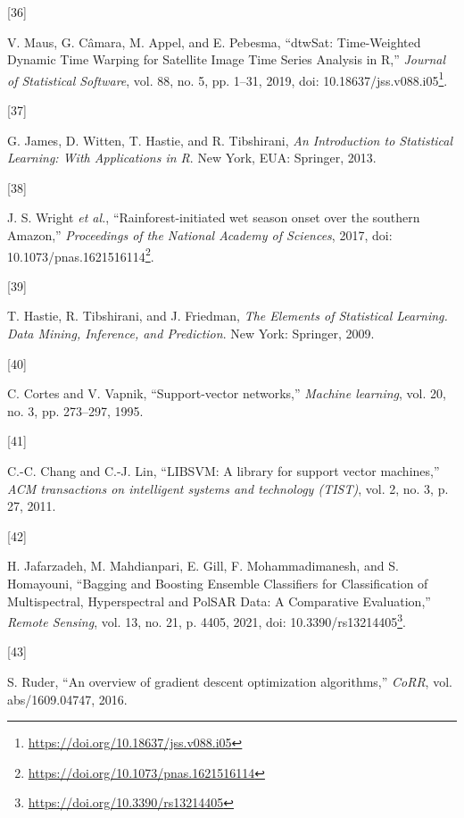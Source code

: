 \documentclass[
  11pt,
]{report}
\newlength{\cslhangindent}
\newlength{\csllabelwidth}
\newlength{\cslentryspacingunit} %
\newenvironment{CSLReferences}[2] %
 {%
  \setlength{\parindent}{0pt}
  \ifodd #1
  \let\oldpar\par
  \def\par{\hangindent=\cslhangindent\oldpar}
  \fi
  \setlength{\parskip}{#2\cslentryspacingunit}
 }%
 {}
\newcommand{\CSLLeftMargin}[1]{\parbox[t]{\csllabelwidth}{#1}}
\newcommand{\CSLRightInline}[1]{\parbox[t]{\linewidth - \csllabelwidth}{#1}\break}
\renewcommand{\href}[2]{#2\footnote{\url{#1}}}
\begin{document}
\begin{CSLReferences}{0}{0}
\leavevmode{}%
\CSLLeftMargin{{[}36{]} }%
\CSLRightInline{V. Maus, G. Câmara, M. Appel, and E. Pebesma,
{``{dtwSat}: {Time-Weighted Dynamic Time Warping} for {Satellite Image
Time Series Analysis} in {R},''} \emph{Journal of Statistical Software},
vol. 88, no. 5, pp. 1--31, 2019, doi:
\href{https://doi.org/10.18637/jss.v088.i05}{10.18637/jss.v088.i05}.}

\leavevmode{}%
\CSLLeftMargin{{[}37{]} }%
\CSLRightInline{G. James, D. Witten, T. Hastie, and R. Tibshirani,
\emph{An {Introduction} to {Statistical Learning}: With {Applications}
in {R}}. {New York, EUA}: {Springer}, 2013.}

\leavevmode{}%
\CSLLeftMargin{{[}38{]} }%
\CSLRightInline{J. S. Wright \emph{et al.}, {``Rainforest-initiated wet
season onset over the southern {Amazon},''} \emph{Proceedings of the
National Academy of Sciences}, 2017, doi:
\href{https://doi.org/10.1073/pnas.1621516114}{10.1073/pnas.1621516114}.}

\leavevmode{}%
\CSLLeftMargin{{[}39{]} }%
\CSLRightInline{T. Hastie, R. Tibshirani, and J. Friedman, \emph{The
{Elements} of {Statistical Learning}. {Data Mining}, {Inference}, and
{Prediction}}. {New York}: {Springer}, 2009.}

\leavevmode{}%
\CSLLeftMargin{{[}40{]} }%
\CSLRightInline{C. Cortes and V. Vapnik, {``Support-vector networks,''}
\emph{Machine learning}, vol. 20, no. 3, pp. 273--297, 1995.}

\leavevmode{}%
\CSLLeftMargin{{[}41{]} }%
\CSLRightInline{C.-C. Chang and C.-J. Lin, {``{LIBSVM}: A library for
support vector machines,''} \emph{ACM transactions on intelligent
systems and technology (TIST)}, vol. 2, no. 3, p. 27, 2011.}

\leavevmode{}%
\CSLLeftMargin{{[}42{]} }%
\CSLRightInline{H. Jafarzadeh, M. Mahdianpari, E. Gill, F.
Mohammadimanesh, and S. Homayouni, {``Bagging and {Boosting Ensemble
Classifiers} for {Classification} of {Multispectral}, {Hyperspectral}
and {PolSAR Data}: {A Comparative Evaluation},''} \emph{Remote Sensing},
vol. 13, no. 21, p. 4405, 2021, doi:
\href{https://doi.org/10.3390/rs13214405}{10.3390/rs13214405}.}

\leavevmode{}%
\CSLLeftMargin{{[}43{]} }%
\CSLRightInline{S. Ruder, {``An overview of gradient descent
optimization algorithms,''} \emph{CoRR}, vol. abs/1609.04747, 2016.}


\end{CSLReferences}
\end{document}
